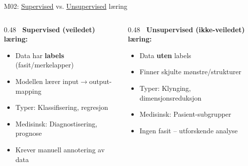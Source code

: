 \documentclass[aspectratio=169, 10pt]{beamer}
\begin{document}
\begin{frame}{M02: \href{https://en.wikipedia.org/wiki/Supervised_learning}{Supervised} vs. \href{https://en.wikipedia.org/wiki/Unsupervised_learning}{Unsupervised} læring}

    \begin{columns}
        \begin{column}{0.48\textwidth}
            \textbf{\faCheckCircle\ Supervised (veiledet) læring:}
            \begin{itemize}
                \item Data har \textbf{labels} (fasit/merkelapper)
                \item Modellen lærer input$\rightarrow$output-mapping
                \item Typer: Klassifisering, regresjon
                \item Medisinsk: Diagnostisering, prognose
                \item Krever manuell annotering av data
            \end{itemize}
        \end{column}

        \begin{column}{0.48\textwidth}
            \textbf{\faSearch\ Unsupervised (ikke-veiledet) læring:}
            \begin{itemize}
                \item Data \textbf{uten} labels
                \item Finner skjulte mønstre/strukturer
                \item Typer: Klynging, dimensjonsreduksjon
                \item Medisinsk: Pasient-subgrupper
                \item Ingen fasit -- utforskende analyse
            \end{itemize}
        \end{column}
    \end{columns}


\end{frame}
\end{document}
